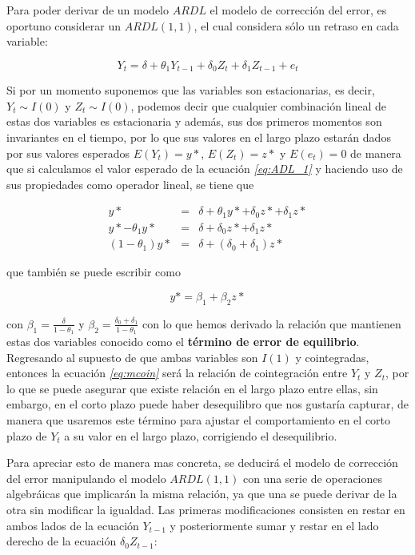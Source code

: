  Para poder derivar de un modelo $ARDL$ el modelo de corrección del error, es oportuno considerar un $ARDL(1,1)$, el cual considera sólo un retraso en cada variable:
 
 \begin{equation}
Y_t=\delta + \theta_1 Y_{t-1} + \delta_0 Z_t + \delta_1 Z_{t-1}  + e_t  \label{eq:ADL_1}
\end{equation}
 
 Si por un momento suponemos que las variables son estacionarias, es decir, $Y_t \sim I(0)$ y $Z_t \sim I(0)$, podemos decir que cualquier combinación lineal de estas dos variables es estacionaria y además, sus dos primeros momentos son invariantes en el tiempo, por lo que sus valores en el largo plazo estarán dados por sus valores esperados $E(Y_t)=y*$, $E(Z_t)=z*$ y $E(e_t)=0$ de manera que si calculamos el valor esperado de la ecuación   \textit{\ref{eq:ADL_1}}  y haciendo uso de sus propiedades como operador lineal, se tiene que
 
 \begin{eqnarray}
y*&=&\delta + \theta_1 y*  + \delta_0 z* + \delta_1 z* \nonumber  \\
 y*- \theta_1 y* &=& \delta + \delta_0 z* + \delta_1 z*  \\
 (1-\theta_1) y* &=& \delta + (\delta_0 + \delta_1)z* \nonumber 
\end{eqnarray}

que también se puede escribir como

\begin{equation}
y*= \beta_1 + \beta_2 z* \label{eq:mcoin}
\end{equation}

con $\beta_1=\frac{\delta}{1-\theta_1}$ y $\beta_2=\frac{\delta_0 + \delta_1}{1-\theta_1}$ con lo que hemos derivado la relación que mantienen estas dos variables conocido como el \textbf{término de error de equilibrio}. Regresando al supuesto de que ambas variables son $I(1)$ y cointegradas, entonces la ecuación  \textit{\ref{eq:mcoin}} será la relación de cointegración entre $Y_t$ y $Z_t$, por lo que se puede asegurar que existe relación en el largo plazo entre ellas, sin embargo, en el corto plazo puede haber desequilibro que nos gustaría capturar, de manera que usaremos este término para ajustar el comportamiento en el corto plazo de $Y_t$ a su valor en el largo plazo, corrigiendo el desequilibrio. \bigskip

Para apreciar esto de manera mas concreta, se deducirá el modelo de corrección del error manipulando el modelo $ARDL(1,1)$ con una serie de operaciones algebráicas que implicarán la misma relación, ya que una se puede derivar de la otra sin modificar la igualdad. Las primeras modificaciones consisten en restar en ambos lados de la ecuación $Y_{t-1}$ y posteriormente sumar y restar en el lado derecho de la ecuación $\delta_0 Z_{t-1}$:

